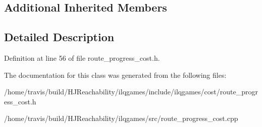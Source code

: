\subsection*{Additional Inherited Members}


\subsection{Detailed Description}


Definition at line 56 of file route\+\_\+progress\+\_\+cost.\+h.



The documentation for this class was generated from the following files\+:\begin{DoxyCompactItemize}
\item 
/home/travis/build/\+H\+J\+Reachability/ilqgames/include/ilqgames/cost/route\+\_\+progress\+\_\+cost.\+h\item 
/home/travis/build/\+H\+J\+Reachability/ilqgames/src/route\+\_\+progress\+\_\+cost.\+cpp\end{DoxyCompactItemize}
